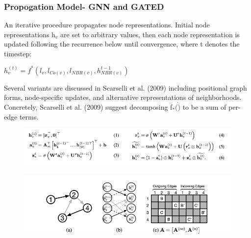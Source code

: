 \documentclass{article}
\begin{document}
\subsubsection{Propogation Model- GNN and GATED}
An iterative procedure propagates node representations. Initial node representations h$_v$ are set to arbitrary values, then each node representation is updated following the recurrence below until convergence, where t denotes the timestep:

\begin{math}
h_v^{(t)} = f^\ast(l_v,l_{Co(v)},l_{NBR(v)}, h^{t-1}_{NBR(v)})
\end{math}

Several variants are discussed in Scarselli et al. (2009) including positional graph forms, node-specific updates, and alternative representations of neighborhoods. Concretely, Scarselli et al. (2009) suggest decomposing f$_\ast(\dot)$ to be a sum of per-edge terms.

\begin{figure}[ht]
\vskip 0.2in
\begin{center}
\centerline{\includegraphics[width=\columnwidth]{Images/Bug1-1.png}}
\label{icml-historical}
\end{center}
\vskip -0.2in
\end{figure}

\begin{figure}[ht]
\vskip 0.2in
\begin{center}
\centerline{\includegraphics[width=\columnwidth]{Images/Bug1-2.png}}
\label{icml-historical}
\end{center}
\vskip -0.2in
\end{figure}
\end{document}
